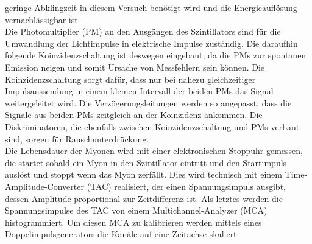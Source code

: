 geringe Abklingzeit in diesem Versuch benötigt wird und die Energieauflösung vernachlässigbar ist. \\
Die Photomultiplier (PM) an den Ausgängen des Szintillators sind für die Umwandlung der Lichtimpulse in elektrische Impulse zuständig. Die daraufhin folgende Koinzidenzschaltung ist deswegen
eingebaut, da die PMs zur spontanen Emission neigen und somit Ursache von Messfehlern sein können. Die Koinzidenzschaltung sorgt dafür, dass nur bei nahezu gleichzeitiger Impulsaussendung in
einem kleinen Intervall der beiden PMs das Signal weitergeleitet wird. Die Verzögerungsleitungen werden so angepasst, dass die Signale aus beiden PMs zeitgleich an der Koinzidenz ankommen.
Die Diskriminatoren, die ebenfalls zwischen Koinzidenzschaltung und PMs verbaut sind, sorgen für Rauschunterdrückung. \\
Die Lebensdauer der Myonen wird mit einer elektronischen Stoppuhr gemessen, die startet sobald ein Myon in den Szintillator eintritt und den Startimpuls auslöst und stoppt wenn das Myon zerfällt.
Dies wird technisch mit einem Time-Amplitude-Converter (TAC) realisiert, der einen Spannungsimpuls ausgibt, dessen Amplitude proportional zur Zeitdifferenz ist. Als letztes werden die
Spannungsimpulse des TAC von einem Multichannel-Analyzer (MCA) histogrammiert. Um diesen MCA zu kalibrieren werden mittels eines Doppelimpulsgenerators die Kanäle auf eine Zeitachse skaliert. \\
